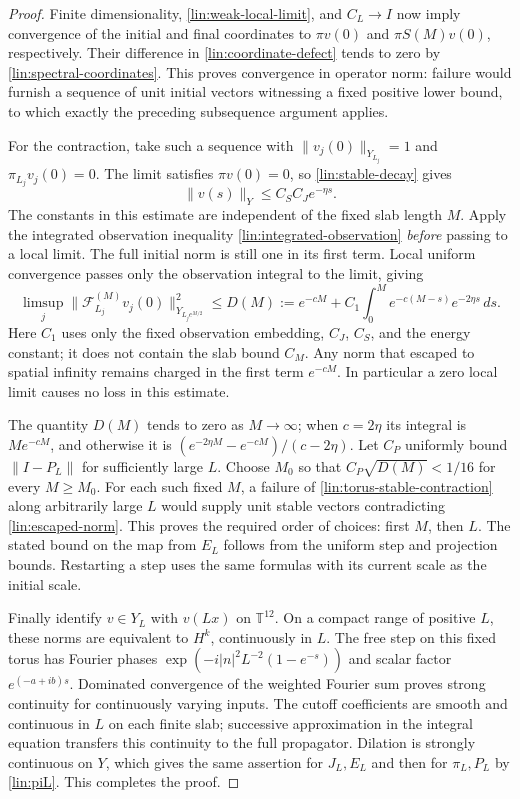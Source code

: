 \documentclass[11pt]{article}
\numberwithin{equation}{section}
\theoremstyle{definition}
\theoremstyle{remark}
\begin{document}
\begin{proof}
Finite dimensionality, \eqref{lin:weak-local-limit}, and $C_L\to I$
now imply convergence of the initial and final coordinates to
$\pi v(0)$ and $\pi S(M)v(0)$, respectively.  Their difference in
\eqref{lin:coordinate-defect} tends to zero by
\eqref{lin:spectral-coordinates}.  This proves convergence in
operator norm: failure would furnish a sequence of unit initial
vectors witnessing a fixed positive lower bound, to which exactly
the preceding subsequence argument applies.

For the contraction, take such a sequence with
$\|v_j(0)\|_{Y_{L_j}}=1$ and $\pi_{L_j}v_j(0)=0$.  The limit satisfies
$\pi v(0)=0$, so \eqref{lin:stable-decay} gives
\[
 \|v(s)\|_Y\le C_SC_Je^{-\eta s}.
\]
The constants in this estimate are independent of the fixed slab
length $M$.  Apply the integrated observation inequality
\eqref{lin:integrated-observation} \emph{before} passing to a local
limit.  The full initial norm is still one in its first term.  Local
uniform convergence passes only the observation integral to the
limit, giving
\begin{equation}\label{lin:escaped-norm}
 \limsup_j\|\mathcal F_{L_j}^{(M)}v_j(0)\|_{Y_{L_je^{M/2}}}^2
 \le D(M):=e^{-cM}+C_1\int_0^M
                         e^{-c(M-s)}e^{-2\eta s}\,ds.
\end{equation}
Here $C_1$ uses only the fixed observation embedding, $C_J$, $C_S$,
and the energy constant; it does not contain the slab bound $C_M$.
Any norm that escaped to spatial infinity remains charged in the
first term $e^{-cM}$.  In particular a zero local limit causes no loss
in this estimate.

The quantity $D(M)$ tends to zero as $M\to\infty$; when $c=2\eta$
its integral is $Me^{-cM}$, and otherwise it is
$(e^{-2\eta M}-e^{-cM})/(c-2\eta)$.  Let $C_P$ uniformly bound
$\|I-P_L\|$ for sufficiently large $L$.  Choose $M_0$ so that
$C_P\sqrt{D(M)}<1/16$ for every $M\ge M_0$.  For each such fixed $M$,
a failure of \eqref{lin:torus-stable-contraction} along arbitrarily
large $L$ would supply unit stable vectors contradicting
\eqref{lin:escaped-norm}.  This proves the required order of choices:
first $M$, then $L$.  The stated bound on the map from $E_L$ follows
from the uniform step and projection bounds.  Restarting a step uses
the same formulas with its current scale as the initial scale.

Finally identify $v\in Y_L$ with $v(Lx)$ on $\mathbb T^{12}$.
On a compact range of positive $L$, these norms are equivalent to
$H^k$, continuously in $L$.  The free step on this fixed torus has
Fourier phases
$\exp(-i|n|^2L^{-2}(1-e^{-s}))$ and scalar factor $e^{(-a+ib)s}$.
Dominated convergence of the weighted Fourier sum proves strong
continuity for continuously varying inputs.  The cutoff coefficients
are smooth and continuous in $L$ on each finite slab; successive
approximation in the integral equation transfers this continuity to
the full propagator.  Dilation is strongly continuous on $Y$, which
gives the same assertion for $J_L,E_L$ and then for $\pi_L,P_L$ by
\eqref{lin:piL}.  This completes the proof.
\end{proof}
\end{document}
